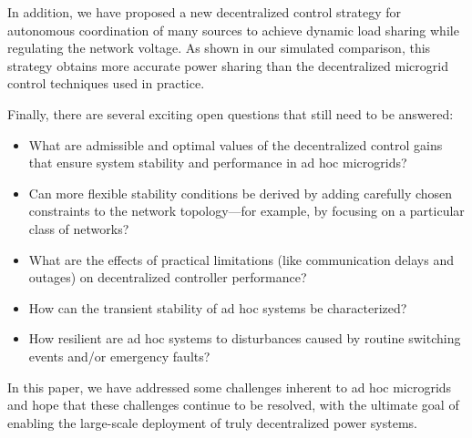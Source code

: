 \documentclass[letterpaper, 10 pt, conference]{ieeeconf}
\begin{document}
In addition, we have proposed a new decentralized control strategy for autonomous coordination of many sources to achieve dynamic load sharing while regulating the network voltage. As shown in our simulated comparison, this strategy obtains more accurate power sharing than the decentralized microgrid control techniques used in practice. 

Finally, there are several exciting open questions that still need to be answered:
\begin{itemize}
    \item What are admissible and optimal values of the decentralized control gains that ensure system stability and performance in ad hoc microgrids?
    \item Can more flexible stability conditions be derived by adding carefully chosen constraints to the network topology---for example, by focusing on a particular class of networks?
    \item What are the effects of practical limitations (like communication delays and outages) on decentralized controller performance?
    \item How can the transient stability of ad hoc systems be characterized?
    \item How resilient are ad hoc systems to disturbances caused by routine switching events and/or emergency faults?
\end{itemize}

In this paper, we have addressed some challenges inherent to ad hoc microgrids and hope that these challenges continue to be resolved, with the ultimate goal of enabling the large-scale deployment of truly decentralized power systems.
\end{document}
